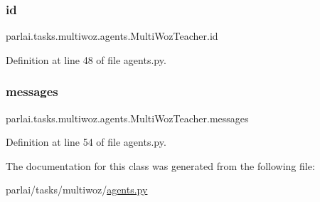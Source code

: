\subsubsection{\texorpdfstring{id}{id}}
{\footnotesize\ttfamily parlai.\+tasks.\+multiwoz.\+agents.\+Multi\+Woz\+Teacher.\+id}



Definition at line 48 of file agents.\+py.

\mbox{\label{classparlai_1_1tasks_1_1multiwoz_1_1agents_1_1MultiWozTeacher_a40d3917ab5dadef1f822ac3c1d06c915}} 
\subsubsection{\texorpdfstring{messages}{messages}}
{\footnotesize\ttfamily parlai.\+tasks.\+multiwoz.\+agents.\+Multi\+Woz\+Teacher.\+messages}



Definition at line 54 of file agents.\+py.



The documentation for this class was generated from the following file\+:\begin{DoxyCompactItemize}
\item 
parlai/tasks/multiwoz/\hyperlink{parlai_2tasks_2multiwoz_2agents_8py}{agents.\+py}\end{DoxyCompactItemize}
